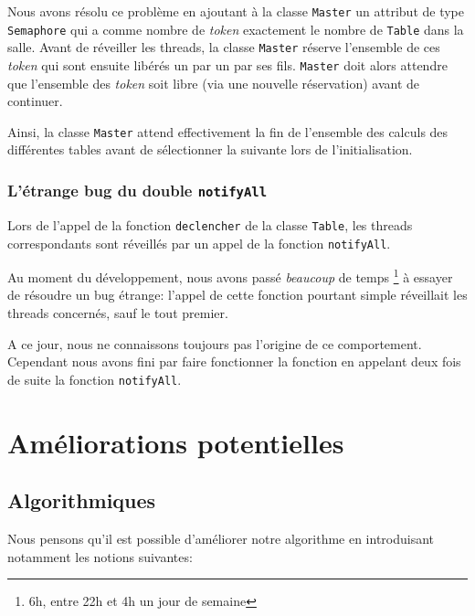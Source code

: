 \documentclass[11pt,a4paper, openany]{book}
\begin{document}
Nous avons résolu ce problème en ajoutant à la classe \texttt{Master} un attribut de type \texttt{Semaphore} qui a comme nombre de \textit{token} exactement le nombre de \texttt{Table} dans la salle. Avant de réveiller les threads, la classe \texttt{Master} réserve l'ensemble de ces \textit{token} qui sont ensuite libérés un par un par ses fils. \texttt{Master} doit alors attendre que l'ensemble des \textit{token} soit libre (via une nouvelle réservation) avant de continuer.

Ainsi, la classe \texttt{Master} attend effectivement la fin de l'ensemble des calculs des différentes tables avant de sélectionner la suivante lors de l'initialisation.

\subsection{L'étrange bug du double \texttt{notifyAll}}

Lors de l'appel de la fonction \texttt{declencher} de la classe \texttt{Table}, les threads correspondants sont réveillés par un appel de la fonction \texttt{notifyAll}.

Au moment du développement, nous avons passé \textit{beaucoup} de temps \footnote{6h, entre 22h et 4h un jour de semaine} à essayer de résoudre un bug étrange: l'appel de cette fonction pourtant simple réveillait les threads concernés, sauf le tout premier.

A ce jour, nous ne connaissons toujours pas l'origine de ce comportement. Cependant nous avons fini par faire fonctionner la fonction en appelant deux fois de suite la fonction \texttt{notifyAll}.

\chapter{Améliorations potentielles}

\section{Algorithmiques}

Nous pensons qu'il est possible d'améliorer notre algorithme en introduisant notamment les notions suivantes:
\end{document}
